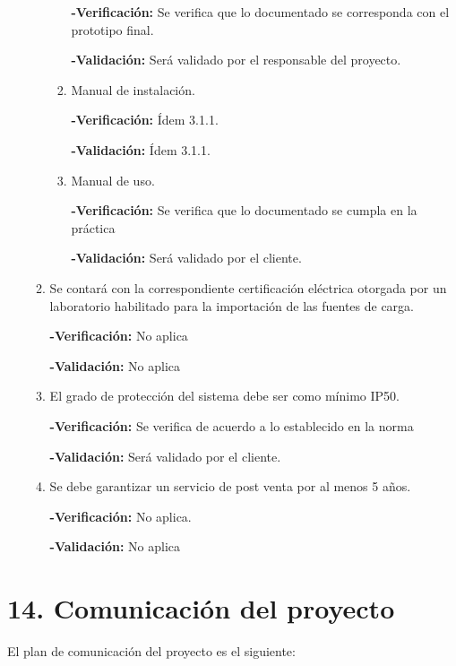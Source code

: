 \documentclass[11pt]{charter}
\begin{document}
\begin{enumerate}
\begin{enumerate}[label*=\arabic*.]
\begin{enumerate}[label*=\arabic*.]
				\textbf{-Verificación:} Se verifica que lo documentado se corresponda con el prototipo final.
		
				\textbf{-Validación:} Será validado por el responsable del proyecto.
				
				\item Manual de instalación.
				
				\textbf{-Verificación:} Ídem 3.1.1.
		
				\textbf{-Validación:} Ídem 3.1.1.
				
				\item Manual de uso.
				
				\textbf{-Verificación:} Se verifica que lo documentado se cumpla en la práctica
		
				\textbf{-Validación:} Será validado por el cliente.
				
			\end{enumerate}
		\item Se contará con la correspondiente certificación eléctrica otorgada por un laboratorio habilitado para la importación de las fuentes de carga.
		
		\textbf{-Verificación:} No aplica
		
		\textbf{-Validación:} No aplica
				
		\item El grado de protección del sistema debe ser como mínimo IP50.
		
		\textbf{-Verificación:} Se verifica de acuerdo a lo establecido en la norma 
		
		\textbf{-Validación:} Será validado por el cliente.
				
		\item Se debe garantizar un servicio de post venta por al menos 5 años.
		
		\textbf{-Verificación:} No aplica.
		
		\textbf{-Validación:} No aplica
				
	\end{enumerate}
\end{enumerate}


\section{14. Comunicación del proyecto}
\label{sec:comunicaciones}

El plan de comunicación del proyecto es el siguiente:
\end{document}
